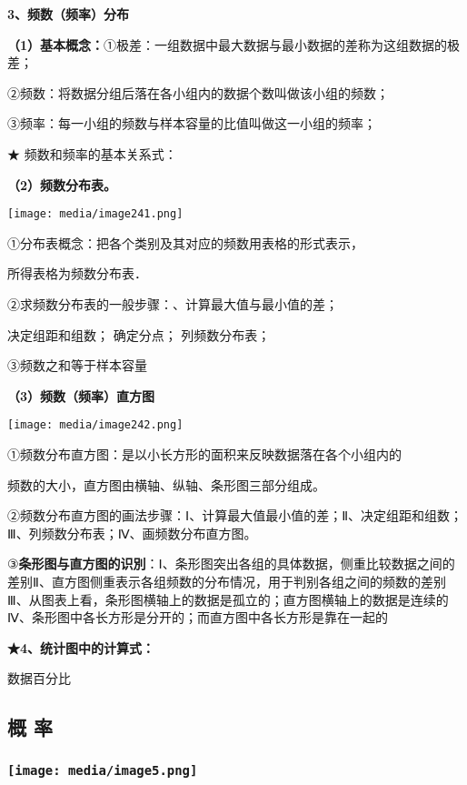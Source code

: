 \documentclass[a4paper,11pt,UTF8]{ctexart}
\begin{document}
\textbf{3、频数（频率）分布}

\textbf{（1）基本概念：}①极差：一组数据中最大数据与最小数据的差称为这组数据的极差；

②频数：将数据分组后落在各小组内的数据个数叫做该小组的频数；

③频率：每一小组的频数与样本容量的比值叫做这一小组的频率；

★ 频数和频率的基本关系式：

\textbf{（2）频数分布表。}

\texttt{[image: media/image241.png]}

①分布表概念：把各个类别及其对应的频数用表格的形式表示，

所得表格为频数分布表．

②求频数分布表的一般步骤：、计算最大值与最小值的差；

决定组距和组数； 确定分点； 列频数分布表；

③频数之和等于样本容量

\textbf{（3）频数（频率）直方图}

\texttt{[image: media/image242.png]}

①频数分布直方图：是以小长方形的面积来反映数据落在各个小组内的

频数的大小，直方图由横轴、纵轴、条形图三部分组成。

②频数分布直方图的画法步骤：Ⅰ、计算最大值最小值的差；Ⅱ、决定组距和组数；Ⅲ、列频数分布表；Ⅳ、画频数分布直方图。

③\textbf{条形图与直方图的识別}：Ⅰ、条形图突出各组的具体数据，侧重比较数据之间的差别Ⅱ、直方图侧重表示各组频数的分布情况，用于判别各组之间的频数的差别Ⅲ、从图表上看，条形图横轴上的数据是孤立的；直方图横轴上的数据是连续的
Ⅳ、条形图中各长方形是分开的；而直方图中各长方形是靠在一起的

\textbf{★4、统计图中的计算式：}

数据百分比

\hypertarget{ux6982-ux7387}{%
\subsection{\texorpdfstring{ 概 率}{ 概 率}}\label{ux6982-ux7387}}

\hypertarget{ux5b66ux79d1ux7f51www.zxxk.com--ux6559ux80b2ux8d44ux6e90ux95e8ux6237ux63d0ux4f9bux8bd5ux9898ux8bd5ux5377ux6559ux6848ux8bfeux4ef6ux6559ux5b66ux8bbaux6587ux7d20ux6750ux7b49ux5404ux7c7bux6559ux5b66ux8d44ux6e90ux5e93ux4e0bux8f7dux8fd8ux6709ux5927ux91cfux4e30ux5bccux7684ux6559ux5b66ux8d44ux8baf-44}{%
\subsubsection{\texorpdfstring{\protect\texttt{[image: media/image5.png]}}{学科网(www.zxxk.com)-\/-教育资源门户，提供试题试卷、教案、课件、教学论文、素材等各类教学资源库下载，还有大量丰富的教学资讯！}}\label{ux5b66ux79d1ux7f51www.zxxk.com--ux6559ux80b2ux8d44ux6e90ux95e8ux6237ux63d0ux4f9bux8bd5ux9898ux8bd5ux5377ux6559ux6848ux8bfeux4ef6ux6559ux5b66ux8bbaux6587ux7d20ux6750ux7b49ux5404ux7c7bux6559ux5b66ux8d44ux6e90ux5e93ux4e0bux8f7dux8fd8ux6709ux5927ux91cfux4e30ux5bccux7684ux6559ux5b66ux8d44ux8baf-44}}
\end{document}
